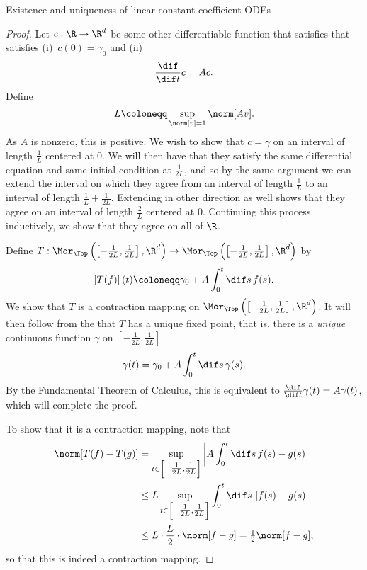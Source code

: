 \begin{thm}{Existence and uniqueness of linear constant coefficient ODEs}{}
\begin{proof}
Let $c:\R \rightarrow \R ^d$ be some other differentiable function that satisfies that satisfies (i)~$c(0)=\gamma _0$ and (ii)
\begin{equation}
\frac{\dif}{\dif t}c=Ac.
\end{equation}
Define
\begin{equation}
L\coloneqq \sup _{\norm[v]=1}\norm[Av].
\end{equation}
As $A$ is nonzero, this is positive.  We wish to show that $c=\gamma$ on an interval of length $\frac{1}{L}$ centered at $0$.  We will then have that they satisfy the same differential equation and same initial condition at $\frac{1}{2L}$, and so by the same argument we can extend the interval on which they agree from an interval of length $\frac{1}{L}$ to an interval of length $\frac{1}{L}+\frac{1}{2L}$.  Extending in other direction as well shows that they agree on an interval of length $\frac{2}{L}$ centered at $0$.  Continuing this process inductively, we show that they agree on all of $\R$.

Define $T:\Mor _{\Top}\left( \left[ -\frac{1}{2L},\frac{1}{2L}\right] ,\R ^d\right) \rightarrow \Mor _{\Top}\left( \left[ -\frac{1}{2L},\frac{1}{2L}\right] ,\R ^d\right)$ by
\begin{equation}
\left[ T(f)\right] (t)\coloneqq \gamma _0+A\int _0^t\dif s\, f(s).
\end{equation}
We show that $T$ is a contraction mapping on $\Mor _{\Top}\left( \left[ -\frac{1}{2L},\frac{1}{2L}\right] ,\R ^d\right)$.  It will then follow from the  that $T$ has a unique fixed point, that is, there is a \emph{unique} continuous function $\gamma$ on $\left[ -\frac{1}{2L},\frac{1}{2L}\right]$
\begin{equation}
\gamma (t)=\gamma _0+A\int _0^t\dif s\, \gamma (s).
\end{equation}
By the Fundamental Theorem of Calculus, this is equivalent to $\frac{\dif}{\dif t}\gamma (t)=A\gamma (t)$, which will complete the proof.

To show that it is a contraction mapping, note that
\begin{equation}
\begin{split}
\norm[T(f)-T(g)] & =\sup _{t\in \left[ -\tfrac{1}{2L},\tfrac{1}{2L}\right]}\left| A\int _0^t\dif s\, f(s)-g(s)\right| \\
& \leq L\sup _{t\in \left[ -\tfrac{1}{2L},\tfrac{1}{2L}\right]}\int _0^t\dif s\, \left| f(s)-g(s)\right| \\
& \leq L\cdot \frac{L}{2}\cdot \norm[f-g]=\tfrac{1}{2}\norm[f-g],
\end{split}
\end{equation}
so that this is indeed a contraction mapping.
\end{proof}
\end{thm}
